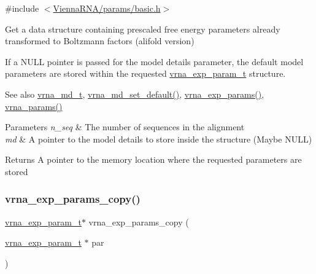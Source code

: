 {\ttfamily \#include $<$\mbox{\hyperlink{params_2basic_8h}{Vienna\+R\+N\+A/params/basic.\+h}}$>$}



Get a data structure containing prescaled free energy parameters already transformed to Boltzmann factors (alifold version) 

If a N\+U\+LL pointer is passed for the model details parameter, the default model parameters are stored within the requested \mbox{\hyperlink{group__energy__parameters_ga01d8b92fe734df8d79a6169482c7d8d8}{vrna\+\_\+exp\+\_\+param\+\_\+t}} structure.

\begin{DoxySeeAlso}{See also}
\mbox{\hyperlink{group__model__details_ga1f8a10e12a0a1915f2a4eff0b28ea17c}{vrna\+\_\+md\+\_\+t}}, \mbox{\hyperlink{group__model__details_ga8ac6ff84936282436f822644bf841f66}{vrna\+\_\+md\+\_\+set\+\_\+default()}}, \mbox{\hyperlink{group__energy__parameters_gab1f3016f96aa96bff020cdd904605afa}{vrna\+\_\+exp\+\_\+params()}}, \mbox{\hyperlink{group__energy__parameters_gad0e3e7e74bdc50d1709d40c92993185e}{vrna\+\_\+params()}}
\end{DoxySeeAlso}

\begin{DoxyParams}{Parameters}
{\em n\+\_\+seq} & The number of sequences in the alignment \\
\hline
{\em md} & A pointer to the model details to store inside the structure (Maybe N\+U\+LL) \\
\hline
\end{DoxyParams}
\begin{DoxyReturn}{Returns}
A pointer to the memory location where the requested parameters are stored 
\end{DoxyReturn}
\mbox{\label{group__energy__parameters_ga70bc46be7cfa5434a71efe241c4f0609}} 
\subsubsection{\texorpdfstring{vrna\_exp\_params\_copy()}{vrna\_exp\_params\_copy()}}
{\footnotesize\ttfamily \mbox{\hyperlink{group__energy__parameters_ga01d8b92fe734df8d79a6169482c7d8d8}{vrna\+\_\+exp\+\_\+param\+\_\+t}}$\ast$ vrna\+\_\+exp\+\_\+params\+\_\+copy (\begin{DoxyParamCaption}\item[{\mbox{\hyperlink{group__energy__parameters_ga01d8b92fe734df8d79a6169482c7d8d8}{vrna\+\_\+exp\+\_\+param\+\_\+t}} $\ast$}]{par }\end{DoxyParamCaption})}



